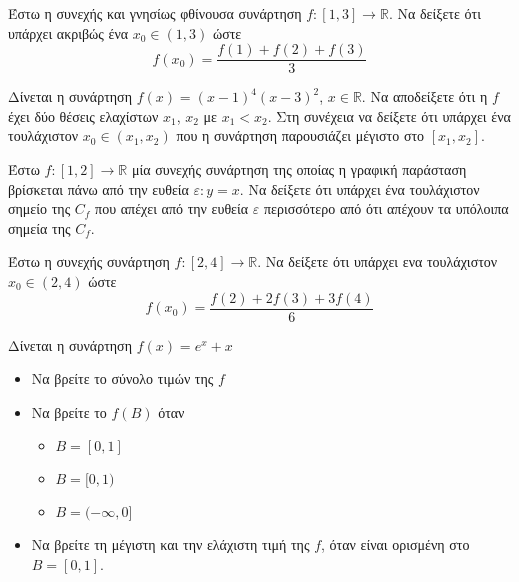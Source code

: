 \documentclass{presentation}
\begin{document}
\begin{askisi}
      Έστω η συνεχής και γνησίως φθίνουσα συνάρτηση $f:[1,3]\to\mathbb{R}$. Να δείξετε ότι υπάρχει ακριβώς ένα $x_0\in (1,3)$ ώστε
      $$f(x_0)=\frac{f(1)+f(2)+f(3)}{3}$$

      \hyperlink{Λύση2}{}
\end{askisi}

\begin{askisi}
      Δίνεται η συνάρτηση $f(x)=(x-1)^4(x-3)^2$, $x\in \mathbb{R}$. Να αποδείξετε ότι η $f$ έχει δύο θέσεις ελαχίστων $x_1$, $x_2$ με $x_1<x_2$. Στη συνέχεια να δείξετε ότι υπάρχει ένα τουλάχιστον $x_0\in (x_1,x_2)$ που η συνάρτηση παρουσιάζει μέγιστο στο $[x_1,x_2]$.

      \hyperlink{Λύση3}{}
\end{askisi}

\begin{askisi}
      Έστω $f:[1,2]\to\mathbb{R}$ μία συνεχής συνάρτηση της οποίας η γραφική παράσταση βρίσκεται πάνω από την ευθεία $ε:y=x$. Να δείξετε ότι υπάρχει ένα τουλάχιστον σημείο της $C_f$ που απέχει από την ευθεία $ε$ περισσότερο από ότι απέχουν τα υπόλοιπα σημεία της $C_f$.

      \hyperlink{Λύση4}{}
\end{askisi}

\begin{askisi}
      Έστω η συνεχής συνάρτηση $f:[2,4]\to\mathbb{R}$. Να δείξετε ότι υπάρχει ενα τουλάχιστον $x_0\in (2,4)$ ώστε
      $$f(x_0)=\frac{f(2)+2f(3)+3f(4)}{6}$$

      \hyperlink{Λύση5}{}
\end{askisi}

\begin{askisi}
      Δίνεται η συνάρτηση $f(x)=e^x+x$
      \begin{itemize}
            \item<1-> Να βρείτε το σύνολο τιμών της $f$
            \item<2-> Να βρείτε το $f(Β)$ όταν
                  \begin{itemize}
                        \item<3-> $Β=[0,1]$
                        \item<4-> $Β=[0,1)$
                        \item<5-> $Β=(-\infty,0]$
                  \end{itemize}
            \item<6-> Να βρείτε τη μέγιστη και την ελάχιστη τιμή της $f$, όταν είναι ορισμένη στο $Β=[0,1]$.
      \end{itemize}

      \hyperlink{Λύση6}{}
\end{askisi}
\end{document}
